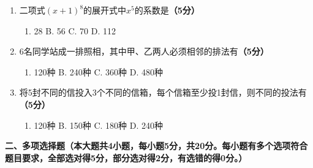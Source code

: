 \documentclass[12pt, a4paper]{ctexart}
\newcommand{\score}[1]{\hfill\textbf{（#1分）}}
\begin{document}
\begin{enumerate}[label=\textbf{\arabic*.}, leftmargin=2em]
\item 二项式$(x+1)^8$的展开式中$x^5$的系数是\score{5}
\begin{enumerate}[label=\Alph*., leftmargin=2em]
\item 28 \quad B. 56 \quad C. 70 \quad D. 112
\end{enumerate}

\item 6名同学站成一排照相，其中甲、乙两人必须相邻的排法有\score{5}
\begin{enumerate}[label=\Alph*., leftmargin=2em]
\item 120种 \quad B. 240种 \quad C. 360种 \quad D. 480种
\end{enumerate}

\item 将5封不同的信投入3个不同的信箱，每个信箱至少投1封信，则不同的投法有\score{5}
\begin{enumerate}[label=\Alph*., leftmargin=2em]
\item 120种 \quad B. 150种 \quad C. 180种 \quad D. 240种
\end{enumerate}

\end{enumerate}

\vspace{0.5cm}

\noindent\textbf{二、多项选择题（本大题共4小题，每小题5分，共20分。每小题有多个选项符合题目要求，全部选对得5分，部分选对得2分，有选错的得0分。）}

\vspace{0.3cm}
\end{document}
